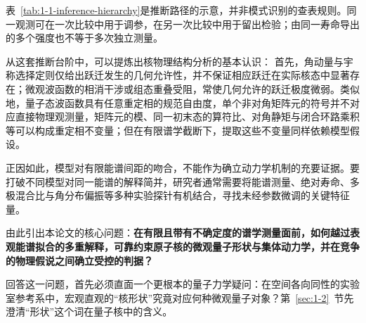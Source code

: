表~\ref{tab:1-1-inference-hierarchy}是推断路径的示意，并非模式识别的查表规则。同一观测可在一次比较中用于调参，在另一次比较中用于留出检验；由同一寿命导出的多个强度也不等于多次独立测量。

从这套推断台阶中，可以提炼出核物理结构分析的基本认识：
首先，角动量与宇称选择定则仅给出跃迁发生的几何允许性，并不保证相应跃迁在实际核态中显著存在；微观波函数的相消干涉或组态重叠受阻，常使几何允许的跃迁极度微弱。类似地，量子态波函数具有任意重定相的规范自由度，单个非对角矩阵元的符号并不对应直接物理观测量，矩阵元的模、同一初末态的算符比、对角静矩与闭合环路乘积等可以构成重定相不变量；但在有限谱学截断下，提取这些不变量同样依赖模型假设。

正因如此，模型对有限能谱间距的吻合，不能作为确立动力学机制的充要证据。要打破不同模型对同一能谱的解释简并，研究者通常需要将能谱测量、绝对寿命、多极混合比与角分布偏振等多种实验探针有机结合，寻找未经参数微调的关键特征量。

由此引出本论文的核心问题：\textbf{在有限且带有不确定度的谱学测量面前，如何越过表观能谱拟合的多重解释，可靠约束原子核的微观量子形状与集体动力学，并在竞争的物理假说之间确立受控的判据？}

回答这一问题，首先必须直面一个更根本的量子力学疑问：在空间各向同性的实验室参考系中，宏观直观的``核形状''究竟对应何种微观量子对象？第~\ref{sec:1-2}~节先澄清``形状''这个词在量子核中的含义。
